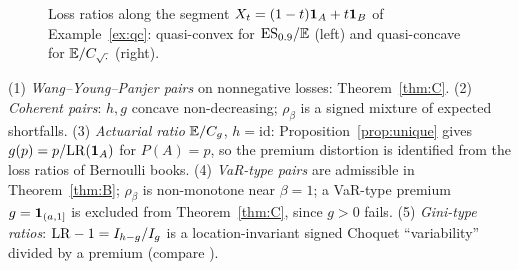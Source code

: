 \begin{figure}[ht]
\centering
{}
\caption{Loss ratios along the segment $X_t=(1-t)\mathbf 1_A+t\mathbf 1_B$ of Example~\ref{ex:qc}: quasi-convex for
$\mathrm{ES}_{0.9}/\mathbb E$ (left) and quasi-concave for $\mathbb E/C_{\sqrt{\cdot}}$ (right).}\label{fig:qc}
\end{figure}

\begin{example}
(1) \emph{Wang--Young--Panjer pairs} on nonnegative losses: Theorem~\ref{thm:C}.
(2) \emph{Coherent pairs}: $h,g$ concave non-decreasing; $\rho_\beta$ is a signed mixture of expected shortfalls.
(3) \emph{Actuarial ratio} $\mathbb E/C_g$, $h=\mathrm{id}$: Proposition~\ref{prop:unique} gives $g(p)=p/\mathrm{LR}(\mathbf 1_A)$ for $P(A)=p$, so the
premium distortion is identified from the loss ratios of Bernoulli books.
(4) \emph{VaR-type pairs} are admissible in Theorem~\ref{thm:B}; $\rho_\beta$ is non-monotone near $\beta=1$; a
VaR-type premium $g=\mathbf 1_{(a,1]}$ is excluded from Theorem~\ref{thm:C}, since $g>0$ fails.
(5) \emph{Gini-type ratios}: $\mathrm{LR}-1=I_{h-g}/I_g$ is a location-invariant signed Choquet ``variability'' divided by a
premium (compare \citealp{bfww2022}).
\end{example}
